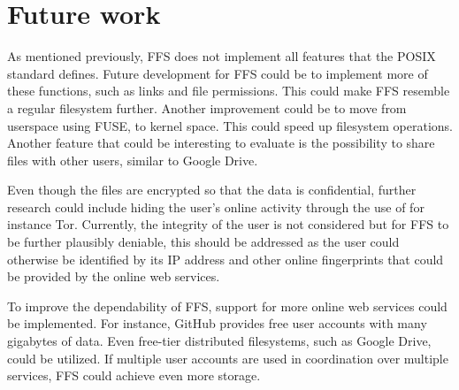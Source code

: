 
\section{Future work}
\label{sec:futureWork}

As mentioned previously, FFS does not implement all features that the POSIX standard defines. Future development for FFS could be to implement more of these functions, such as links and file permissions. This could make FFS resemble a regular filesystem further. Another improvement could be to move from userspace using FUSE, to kernel space. This could speed up filesystem operations. Another feature that could be interesting to evaluate is the possibility to share files with other users, similar to Google Drive.

Even though the files are encrypted so that the data is confidential, further research could include hiding the user's online activity through the use of for instance Tor. Currently, the integrity of the user is not considered but for FFS to be further plausibly deniable, this should be addressed as the user could otherwise be identified by its IP address and other online fingerprints that could be provided by the online web services.

To improve the dependability of FFS, support for more online web services could be implemented. For instance, GitHub provides free user accounts with many gigabytes of data. Even free-tier distributed filesystems, such as Google Drive, could be utilized. If multiple user accounts are used in coordination over multiple services, FFS could achieve even more storage.





